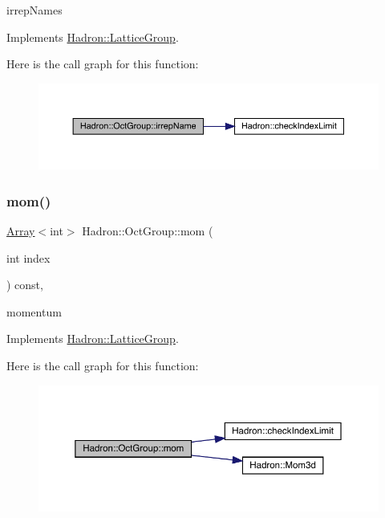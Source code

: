 irrep\+Names 

Implements \mbox{\hyperlink{structHadron_1_1LatticeGroup_a4bc5620218c2a73157e19bc4451fe746}{Hadron\+::\+Lattice\+Group}}.

Here is the call graph for this function\+:
\nopagebreak
\begin{figure}[H]
\begin{center}
\leavevmode
\includegraphics[width=350pt]{d1/de5/structHadron_1_1OctGroup_a58f84ff32d1dce2277f3b9da9d35d594_cgraph}
\end{center}
\end{figure}
\mbox{\label{structHadron_1_1OctGroup_ab3c3d81d578cac614b1ccdd456f8ea59}} 
\subsubsection{\texorpdfstring{mom()}{mom()}\hspace{0.1cm}{\footnotesize\ttfamily [1/2]}}
{\footnotesize\ttfamily \mbox{\hyperlink{classXMLArray_1_1Array}{Array}}$<$int$>$ Hadron\+::\+Oct\+Group\+::mom (\begin{DoxyParamCaption}\item[{int}]{index }\end{DoxyParamCaption}) const\hspace{0.3cm}{\ttfamily [inline]}, {\ttfamily [virtual]}}

momentum 

Implements \mbox{\hyperlink{structHadron_1_1LatticeGroup_ad577b65041dd9a6e84b1f3bd49cb8fce}{Hadron\+::\+Lattice\+Group}}.

Here is the call graph for this function\+:
\nopagebreak
\begin{figure}[H]
\begin{center}
\leavevmode
\includegraphics[width=350pt]{d1/de5/structHadron_1_1OctGroup_ab3c3d81d578cac614b1ccdd456f8ea59_cgraph}
\end{center}
\end{figure}
\mbox{\label{structHadron_1_1OctGroup_ab3c3d81d578cac614b1ccdd456f8ea59}} 
